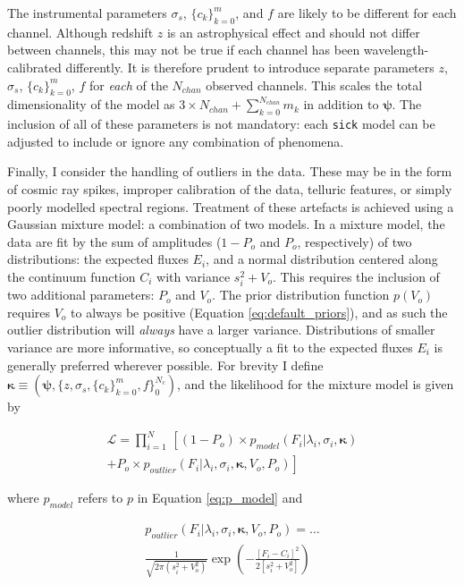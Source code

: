\documentclass[iop]{emulateapj}
\newcommand{\sick}{\texttt{sick}}
\begin{document}
The instrumental parameters $\sigma_{s}$, $\{c_k\}_{k=0}^{m}$, and $f$ are likely 
to be different for each channel. Although redshift $z$ is an astrophysical effect 
and should not differ between channels, this may not be true if each channel has 
been wavelength-calibrated differently. It is therefore prudent to introduce 
separate parameters $z$, $\sigma_{s}$, $\{c_k\}_{k=0}^{m}$, $f$ for \textit{each} 
of the $N_{chan}$ observed channels. This scales the total dimensionality of the 
model as $3\times{}N_{chan} + \sum_{k=0}^{N_{chan}}m_{k}$ in addition to $\bm{\psi}$. 
The inclusion of all of these parameters is not mandatory: each \sick{} model can 
be adjusted to include or ignore any combination of phenomena. 

Finally, I consider the handling of outliers in the data. These may be in the form 
of cosmic ray spikes, improper calibration of the data, telluric features, or simply 
poorly modelled spectral regions. Treatment of these artefacts is achieved using a 
Gaussian mixture model: a combination of two models. In a mixture model, the data 
are fit by the sum of amplitudes ($1 - P_o$ and $P_o$, respectively) of two 
distributions: the expected fluxes $E_i$, and a normal distribution centered along 
the continuum function $C_i$ with variance $s_{i}^2 + V_{o}$. This requires the 
inclusion of two  additional parameters: $P_o$ and $V_o$. The prior 
distribution function $p\left(V_o\right)$ requires $V_{o}$ to always be positive 
(Equation \ref{eq:default_priors}), and as such the outlier distribution will 
\textit{always} have a larger variance. Distributions of smaller variance are more 
informative, so conceptually a fit to the expected fluxes $E_{i}$ is generally 
preferred wherever possible. For brevity I define $\bm{\kappa} \equiv (\bm{\psi},\{z,\sigma_s,\{c_k\}_{k=0}^{m},f\}_{0}^{N_{c}})$, and the likelihood for the mixture model is given by
 
 \begin{multline}
\mathcal{L} = \prod_{i=1}^{N}\,\left[\left(1 - P_{o}\right)\times{}p_{model}\left(F_i|\lambda_i,\sigma_{i},\bm{\kappa}\right)\right. \\
+ \left. P_{o}\times{}p_{outlier}\left(F_i|\lambda_i,\sigma_i,\bm{\kappa},V_{o},P_o\right)\right]
\end{multline}
 
\noindent{}where $p_{model}$ refers to $p$ in Equation \ref{eq:p_model} and 

\begin{multline}
p_{outlier}\left(F_i|\lambda_i,\sigma_i,\bm{\kappa},V_{o},P_o\right) = \dots \\
  \frac{1}{\sqrt{2\pi\left(s_{i}^2 + V_{o}^2\right)}} \exp\left(-\frac{[F_i - C_i]^2}{2\left[s_{i}^2 + V_{o}^2\right]}\right)
\end{multline}
\end{document}
